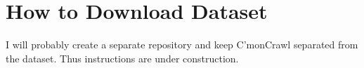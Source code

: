 \chapter{How to Download Dataset}
\label{chap:download}
I will probably create a separate repository and keep C'monCrawl separated from the dataset.
Thus instructions are under construction.




